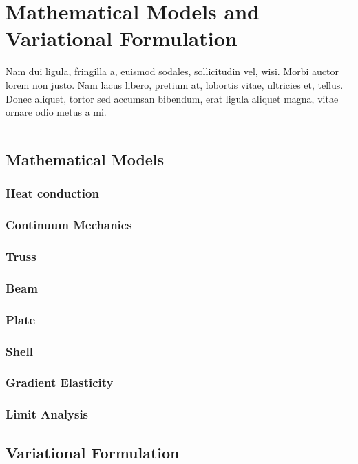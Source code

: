 \let\clearforchapter\par %
\chapter{Mathematical Models and Variational Formulation} 
Nam dui ligula, fringilla a, euismod sodales, sollicitudin vel, wisi. Morbi auctor lorem non justo. Nam lacus libero, pretium at, lobortis vitae, ultricies et, tellus. Donec aliquet, tortor sed accumsan bibendum, erat ligula aliquet magna, vitae ornare odio metus a mi.

\par\fancybreak{$***$}\par

\section{Mathematical Models}
\subsection{Heat conduction}

\subsection{Continuum Mechanics}

\subsection{Truss}

\subsection{Beam}

\subsection{Plate}

\subsection{Shell}

\subsection{Gradient Elasticity}

\subsection{Limit Analysis}

\section{Variational Formulation}

